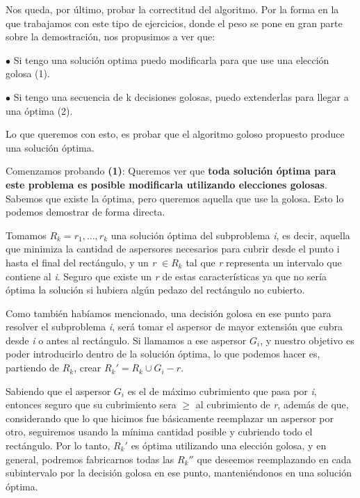 \documentclass[./main.tex]{subfiles}
\begin{document}
Nos queda, por último, probar la correctitud del algoritmo. Por la forma en la que trabajamos con este tipo de ejercicios, donde el peso se pone en gran parte sobre la demostración, nos propusimos a ver que: \newline

$\bullet$ Si tengo una solución optima puedo modificarla para que use una elección golosa (1). \newline

$\bullet$ Si tengo una secuencia de k decisiones golosas, puedo extenderlas para llegar a una óptima (2).\newline

Lo que queremos con esto, es probar que el algoritmo goloso propuesto produce una solución óptima. \newline \newline 

Comenzamos probando \textbf{(1)}: Queremos ver que \textbf{toda solución óptima para este problema es posible modificarla utilizando elecciones golosas}. Sabemos que existe la óptima, pero queremos aquella que use la golosa. Esto lo podemos demostrar de forma directa. \newline 

Tomamos \(R_{k} = r_{1}, \ldots, r_{k}\) una solución óptima del subproblema \textit{i}, es decir, aquella que minimiza la cantidad de aspersores necesarios para cubrir desde el punto i hasta el final del rectángulo, y un \textit{r} \(\in R_{k}\) tal que \textit{r} representa un intervalo que contiene al \textit{i}. Seguro que existe un \textit{r} de estas características ya que no sería óptima la solución si hubiera algún pedazo del rectángulo no cubierto. \newline

Como también habíamos mencionado, una decisión golosa en ese punto para resolver el subproblema \textit{i}, será tomar el aspersor de mayor extensión que cubra desde \textit{i} o antes al rectángulo.
Si llamamos a ese aspersor \(G_{i}\), y nuestro objetivo es poder introducirlo dentro de la solución óptima, lo que podemos hacer es, partiendo de \(R_{k}\), crear \(R_{k}' = R_{k} \cup G_{i} - r\). \newline 

Sabiendo que el aspersor $G_{i}$ es el de máximo cubrimiento que pasa por \textit{i}, entonces seguro que su cubrimiento sera $\geq$ al cubrimiento de \textit{r}, además de que, considerando que lo que hicimos fue básicamente reemplazar un aspersor por otro, seguiremos usando la mínima cantidad posible y cubriendo todo el rectángulo. Por lo tanto, $ R_{k}'$ es óptima utilizando una elección golosa, y en general, podremos fabricarnos todas las $ R_{k}''$ que deseemos reemplazando en cada subintervalo por la decisión golosa en ese punto, manteniéndonos en una solución óptima.\done\newline\newline
\end{document}
